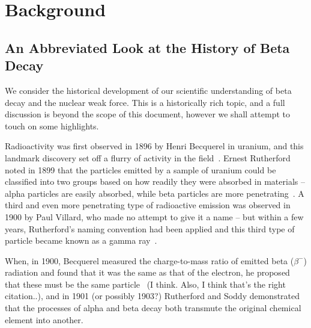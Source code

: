 


\chapter{Background}
\label{intro_chapter}
\label{nuclear_chapter}

\section{An Abbreviated Look at the History of Beta Decay}
We consider the historical development of our scientific understanding of beta decay and the nuclear weak force.  This is a historically rich topic, and a full discussion is beyond the scope of this document, however we shall attempt to touch on some highlights.

Radioactivity was first observed in 1896 by Henri Becquerel in uranium, and this landmark discovery set off a flurry of activity in the field~\cite{becquerel1896}.
Ernest Rutherford noted in 1899 that the particles emitted by a sample of uranium could be classified into two groups based on how readily they were absorbed in materials -- alpha particles are easily absorbed, while beta particles are more penetrating~\cite{rutherford1899}.  A third and even more penetrating type of radioactive emission was observed in 1900 by Paul Villard, who made no attempt to give it a name -- but within a few years, Rutherford's naming convention had been applied and this third type of particle became known as a gamma ray~\cite{villard1900}\cite{rutherford1903}.  

When, in 1900, Becquerel measured the charge-to-mass ratio of emitted beta ($\beta^-$) radiation and found that it was the same as that of the electron, he proposed that these must be the same particle~\cite{becquerel1900} (I think.  Also, I think that's the right citation..), and in 1901 (or possibly 1903?) Rutherford and Soddy demonstrated that the processes of alpha and beta decay both transmute the original chemical element into another.  

